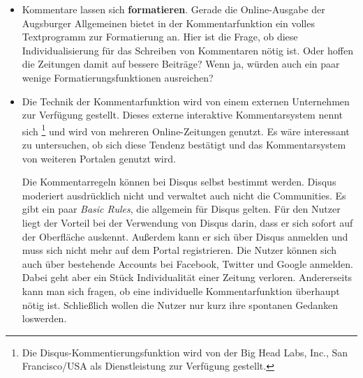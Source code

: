 \begin{itemize}


\item Kommentare lassen sich {\bfseries formatieren}. Gerade die Online-Ausgabe der Augsburger Allgemeinen bietet in der Kommentarfunktion ein volles Textprogramm zur Formatierung an.  Hier ist die Frage, ob diese Individualisierung für das Schreiben von  Kommentaren nötig ist. Oder hoffen die Zeitungen damit auf bessere Beiträge? Wenn ja, würden auch ein paar wenige Formatierungsfunktionen ausreichen? \\

\item Die Technik der Kommentarfunktion wird von einem externen Unternehmen zur Verfügung gestellt. Dieses externe interaktive
Kommentarsystem nennt sich \grqq\footnote{Die Disqus-Kommentierungsfunktion wird von der Big Head Labs, Inc., San Francisco/USA als Dienstleistung zur Verfügung gestellt.} und wird von mehreren Online-Zeitungen genutzt. Es wäre interessant zu untersuchen, ob sich diese Tendenz bestätigt und das Kommentarsystem von weiteren Portalen genutzt wird. 

Die Kommentarregeln können bei Disqus selbst bestimmt werden. Disqus moderiert ausdrücklich nicht und verwaltet auch nicht die Communities. Es gibt ein paar \emph{Basic Rules}, die allgemein für Disqus gelten. Für den Nutzer liegt der Vorteil bei der Verwendung von Disqus darin, dass er sich sofort auf der Oberfläche auskennt. Außerdem kann er sich über Disqus anmelden und muss sich nicht mehr auf dem Portal registrieren. Die Nutzer können sich auch über bestehende Accounts bei Facebook, Twitter und Google anmelden. Dabei geht aber ein Stück Individualität einer Zeitung verloren. Andererseits kann man sich fragen, ob eine individuelle Kommentarfunktion überhaupt nötig ist. Schließlich wollen die Nutzer nur kurz ihre spontanen Gedanken loswerden. \\






\end{itemize}
